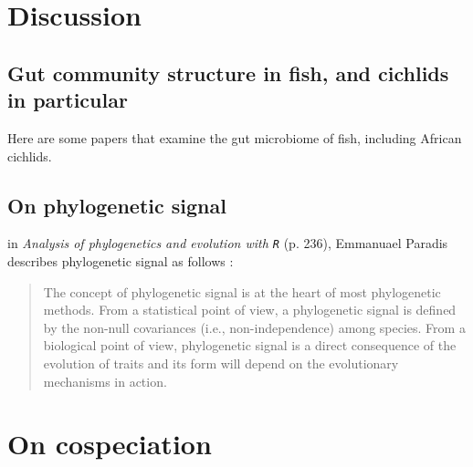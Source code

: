 \section{Discussion}

\subsection{Gut community structure in fish, and cichlids in particular}

Here are some papers that examine the gut microbiome of fish, including African cichlids.




\subsection{On phylogenetic signal}

in {\em Analysis of phylogenetics and evolution with {\tt R}} (p. 236), Emmanuael Paradis describes phylogenetic signal as follows :

\begin{quote}
The concept of phylogenetic signal is at the heart of most phylogenetic methods. From a statistical point of view, a phylogenetic signal is defined by the non-null covariances (i.e., non-independence) among species. From a biological point of view, phylogenetic signal is a direct consequence of the evolution of traits and its form will depend on the evolutionary mechanisms in action.
\end{quote}



\section{On cospeciation}

